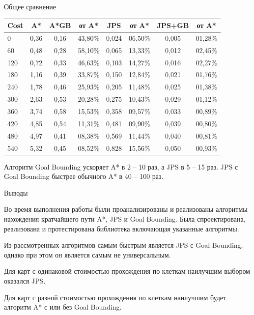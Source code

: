 \documentclass{beamer}
\begin{document}
\begin{frame}{Общее сравнение}{}

\hspace{-1.5em}
	\begin{tabular}{|l|c|c|c|c|c|c|c|}
		\hline
Cost& A* & A*GB& от A* &JPS& от A*&JPS+GB& от A* \\
\hline 	
0	& 0,36	& 0,16	& 43,80\%	& 0,024	& 06,50\%	& 0,005 & 01,28\% \\
\hline
60	& 0,48	& 0,28	& 58,10\%	& 0,065	& 13,33\%	& 0,012 & 02,45\% \\
\hline
120	& 0,72	& 0,33	& 46,63\%	& 0,103	& 14,27\%	& 0,016 & 02,27\% \\
\hline
180	& 1,16	& 0,39	& 33,87\%	& 0,150	& 12,84\%	& 0,021 & 01,76\% \\
\hline
240	& 1,78	& 0,46	& 25,93\%	& 0,205	& 11,48\%	& 0,025 & 01,38\% \\
\hline
300	& 2,63	& 0,53	& 20,28\%	& 0,275	& 10,43\%	& 0,029 & 01,12\% \\
\hline
360	& 3,74	& 0,58	& 15,53\%	& 0,358	& 09,57\%	& 0,033 & 00,89\% \\
\hline
420	& 4,85	& 0,54	& 11,31\%	& 0,481	& 09,90\%	& 0,039 & 00,80\% \\
\hline
480	& 4,97	& 0,41	& 08,38\%	& 0,569	& 11,44\%	& 0,040 & 00,81\% \\
\hline
540	& 5,32	& 0,45	& 08,52\%	& 0,828	& 15,56\%	& 0,050 & 00,93\% \\
\hline
	\end{tabular}

\vspace{0.5\baselineskip}

Алгоритм Goal Bounding ускоряет A* в 2 -- 10 раз, а JPS в 5 -- 15 раз. JPS с Goal Bounding быстрее обычного A* в 40 -- 100 раз.

\end{frame}

\begin{frame}{Выводы}{}

\setlength\parindent{24pt}

Во время выполнения работы были проанализированы и реализованы алгоритмы нахождения кратчайшего пути A*, JPS и Goal Bounding. Была спроектирована, реализована и протестирована библиотека включающая указанные алгоритмы.

Из рассмотренных алгоритмов самым быстрым является JPS с Goal Bounding, однако при этом он является самым не универсальным. 

Для карт с одинаковой стоимостью прохождения по клеткам наилучшим выбором оказался JPS. 

Для карт с разной стоимостью прохождения по клеткам наилучшим будет алгоритм A* с или без Goal Bounding.

\end{frame}
\end{document}
